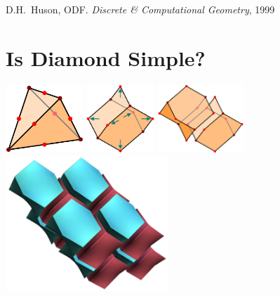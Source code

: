 \documentclass{beamer}
\begin{document}
\begin{frame}
\begin{center}
    {\small
      D.H.\ Huson, ODF. {\it Discrete \& Computational Geometry}, 1999
    }
  \end{center}
\end{frame}


\section{Is Diamond Simple?}

\begin{frame}
  \begin{center}
    \includegraphics[height=1.0in]{extetra1}
    \hspace{2mm}
    \includegraphics[height=1.0in]{extetra2}
    \hspace{2mm}
    \includegraphics[height=1.0in]{extetra3}\\[2mm]
    \includegraphics[height=2.0in]{diamond-tiling}
  \end{center}
\end{frame}
\end{document}
